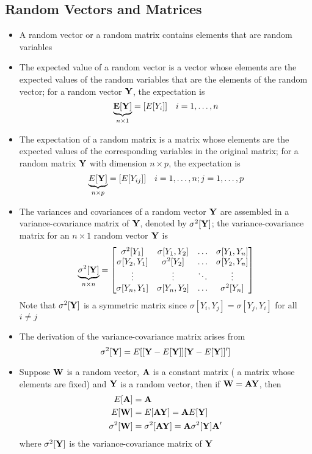 \subsection{Random Vectors and Matrices}
\begin{itemize}
\item A random vector or a random matrix contains elements that are random variables 
\item The expected value of a random vector is a vector whose elements are the expected values of the random variables that are the elements of the random vector; for a random vector $\mathbf{Y}$, the expectation is $$ \underbrace{\mathbf{E[Y]}}_{n \times 1} = [E[Y_i]] ~~~ i = 1,\dots,n $$ 
\item The expectation of a random matrix is a matrix whose elements are the expected values of the corresponding variables in the original matrix; for a random matrix $\mathbf{Y}$ with dimension $n \times p$, the expectation is $$ \underbrace{E[\mathbf{Y}]}_{n \times p} = [E[Y_{ij}]] ~~~ i = 1,\dots,n; j = 1,\dots, p $$ 
\item The variances and covariances of a random vector $\mathbf{Y}$ are assembled in a variance-covariance matrix of $\mathbf{Y}$, denoted by $\sigma^2[\mathbf{Y}]$; the variance-covariance matrix for an $n \times 1$ random vector $\mathbf{Y}$ is $$ \underbrace{\sigma^2[\mathbf{Y}]}_{n \times n} = \begin{bmatrix} \sigma^2[Y_1] & \sigma[Y_1, Y_2] & \hdots & \sigma[Y_1,Y_n] \\ \sigma[Y_2, Y_1] & \sigma^2[Y_2] & \hdots & \sigma[Y_2, Y_n] \\  \vdots & \vdots & \ddots & \vdots \\ \sigma[Y_n,Y_1] & \sigma[Y_n, Y_2] & \hdots & \sigma^2[Y_n] \end{bmatrix} $$ Note that $\sigma^2[\mathbf{Y}]$ is a symmetric matrix since $\sigma[Y_i, Y_j] = \sigma[Y_j, Y_i]$ for all $i \neq j$ 
\item The derivation of the variance-covariance matrix arises from $$\sigma^2[\mathbf{Y}]  = E[[\mathbf{Y} - E[\mathbf{Y}]][\mathbf{Y} - E[\mathbf{Y}]]']$$ 
\item Suppose $\mathbf{W}$ is a random vector, $\mathbf{A}$ is a constant matrix ( a matrix whose elements are fixed) and $\mathbf{Y}$ is a random vector, then if $\mathbf{W} = \mathbf{AY}$, then $$ \begin{aligned} E[\mathbf{A}] &= \mathbf{A} \\ E[\mathbf{W} ]&= E[\mathbf{AY}] = \mathbf{A}E[\mathbf{Y}] \\ \sigma^2[\mathbf{W}] &= \sigma^2[\mathbf{AY}] = \mathbf{A}\sigma^2[\mathbf{Y}]\mathbf{A'} \end{aligned} $$ where $\sigma^2[\mathbf{Y}]$ is the variance-covariance matrix of $\mathbf{Y}$

\end{itemize}
